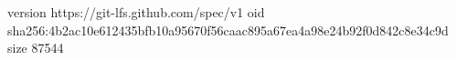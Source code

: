 version https://git-lfs.github.com/spec/v1
oid sha256:4b2ac10e612435bfb10a95670f56caac895a67ea4a98e24b92f0d842c8e34c9d
size 87544
